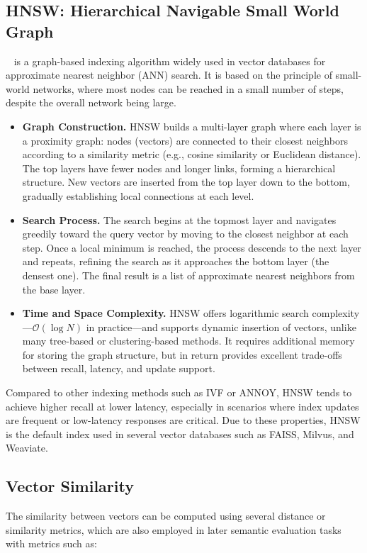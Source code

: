 \subsection{HNSW: Hierarchical Navigable Small World Graph}

~\cite{malkov2018efficient} is a graph-based indexing algorithm widely used in vector databases for approximate nearest neighbor (\gls{ANN}) search. It is based on the principle of small-world networks, where most nodes can be reached in a small number of steps, despite the overall network being large.

\begin{itemize}
    \item \textbf{Graph Construction.} HNSW builds a multi-layer graph where each layer is a proximity graph: nodes (vectors) are connected to their closest neighbors according to a similarity metric (e.g., cosine similarity or Euclidean distance). The top layers have fewer nodes and longer links, forming a hierarchical structure. New vectors are inserted from the top layer down to the bottom, gradually establishing local connections at each level.

    \item \textbf{Search Process.} The search begins at the topmost layer and navigates greedily toward the query vector by moving to the closest neighbor at each step. Once a local minimum is reached, the process descends to the next layer and repeats, refining the search as it approaches the bottom layer (the densest one). The final result is a list of approximate nearest neighbors from the base layer.

    \item \textbf{Time and Space Complexity.} HNSW offers logarithmic search complexity—$\mathcal{O}(\log N)$ in practice—and supports dynamic insertion of vectors, unlike many tree-based or clustering-based methods. It requires additional memory for storing the graph structure, but in return provides excellent trade-offs between recall, latency, and update support.
\end{itemize}

Compared to other indexing methods such as IVF or ANNOY, HNSW tends to achieve higher recall at lower latency, especially in scenarios where index updates are frequent or low-latency responses are critical. Due to these properties, HNSW is the default index used in several vector databases such as FAISS, Milvus, and Weaviate.

\subsection{Vector Similarity}
\label{sec:vector-similarity}
The similarity between vectors can be computed using several distance or similarity metrics, which are also employed in later semantic evaluation tasks with metrics such as:

